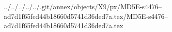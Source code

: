../../../../../.git/annex/objects/X9/px/MD5E-s4476--ad7d1f65fed44b18660d5741d36ded7a.tex/MD5E-s4476--ad7d1f65fed44b18660d5741d36ded7a.tex